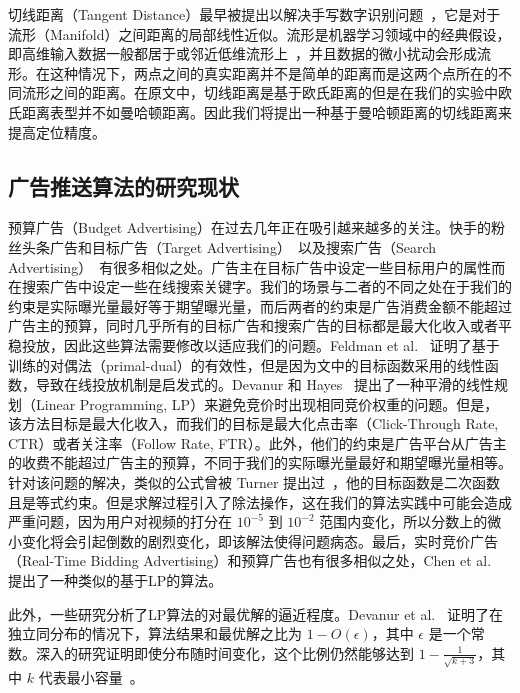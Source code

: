 切线距离（Tangent Distance）最早被提出以解决手写数字识别问题~\cite{simard1998transformation}，它是对于流形（Manifold）之间距离的局部线性近似。流形是机器学习领域中的经典假设，即高维输入数据一般都居于或邻近低维流形上~\cite{roweis2000nonlinear}，并且数据的微小扰动会形成流形。在这种情况下，两点之间的真实距离并不是简单的距离而是这两个点所在的不同流形之间的距离。在原文中，切线距离是基于欧氏距离的但是在我们的实验中欧氏距离表型并不如曼哈顿距离。因此我们将提出一种基于曼哈顿距离的切线距离来提高定位精度。

\subsection{广告推送算法的研究现状}

预算广告（Budget Advertising）在过去几年正在吸引越来越多的关注。快手的粉丝头条广告和目标广告（Target Advertising）~\cite{xu2015smart}以及搜索广告（Search Advertising）~\cite{mehta2005adwords}有很多相似之处。广告主在目标广告中设定一些目标用户的属性而在搜索广告中设定一些在线搜索关键字。我们的场景与二者的不同之处在于我们的约束是实际曝光量最好等于期望曝光量，而后两者的约束是广告消费金额不能超过广告主的预算，同时几乎所有的目标广告和搜索广告的目标都是最大化收入或者平稳投放，因此这些算法需要修改以适应我们的问题。Feldman et al. ~\cite{feldman2010online}证明了基于训练的对偶法（primal-dual）的有效性，但是因为文中的目标函数采用的线性函数，导致在线投放机制是启发式的。Devanur 和 Hayes~\cite{devanur2009adwords} 提出了一种平滑的线性规划（Linear Programming, LP）来避免竞价时出现相同竞价权重的问题。但是，该方法目标是最大化收入，而我们的目标是最大化点击率（Click-Through Rate, CTR）或者关注率（Follow Rate, FTR）。此外，他们的约束是广告平台从广告主的收费不能超过广告主的预算，不同于我们的实际曝光量最好和期望曝光量相等。针对该问题的解决，类似的公式曾被 Turner 提出过~\cite{turner2012planning}，他的目标函数是二次函数且是等式约束。但是求解过程引入了除法操作，这在我们的算法实践中可能会造成严重问题，因为用户对视频的打分在 $10^{-5}$ 到 $10^{-2}$ 范围内变化，所以分数上的微小变化将会引起倒数的剧烈变化，即该解法使得问题病态。最后，实时竞价广告（Real-Time Bidding Advertising）和预算广告也有很多相似之处，Chen et al.~\cite{chen2011real} 提出了一种类似的基于LP的算法。

此外，一些研究分析了LP算法的对最优解的逼近程度。Devanur et al.~\cite{devanur2011near} 证明了在独立同分布的情况下，算法结果和最优解之比为 $1-O(\epsilon)$，其中 $\epsilon$ 是一个常数。深入的研究证明即使分布随时间变化，这个比例仍然能够达到 $1-\frac{1}{\sqrt{k+3}}$，其中 $k$ 代表最小容量~\cite{alaei2012online}。

